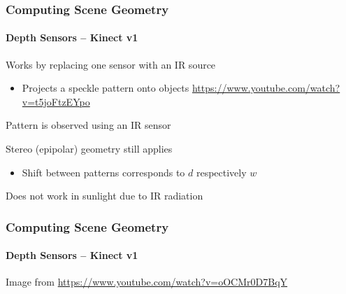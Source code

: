 \documentclass[xetex,professionalfont]{beamer}
\begin{document}

\begin{frame}
\frametitle{Computing Scene Geometry}
\framesubtitle{Depth Sensors -- Kinect v1}

Works by replacing one sensor with an IR source
\begin{itemize}
    \item Projects a speckle pattern onto objects \url{https://www.youtube.com/watch?v=t5joFtzEYpo}
\end{itemize}

\bigskip
Pattern is observed using an IR sensor 

\bigskip
Stereo (epipolar) geometry still applies %
\begin{itemize}
    \item Shift between patterns corresponds to $d$ respectively $w$ %
\end{itemize}

\bigskip
Does not work in sunlight due to IR radiation %

\end{frame}


\begin{frame}
\frametitle{Computing Scene Geometry}
\framesubtitle{Depth Sensors -- Kinect v1}

\begin{center}
    {\centering Image from \url{https://www.youtube.com/watch?v=oOCMr0D7BqY}}
\end{center}

\end{frame}

\end{document}
